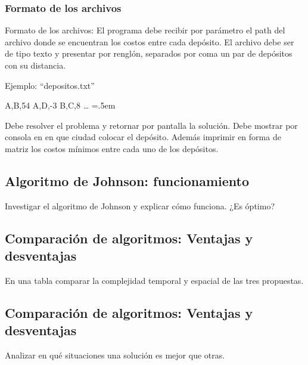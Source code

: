 \documentclass[titlepage,a4paper]{article}
\newenvironment{lcverbatim}
 {\SaveVerbatim{cverb}}
 {\endSaveVerbatim
  \flushleft\fboxrule=0pt\fboxsep=.5em
  \colorbox{cverbbg}{%
    \makebox[\dimexpr\linewidth-2\fboxsep][l]{\BUseVerbatim{cverb}}%
  }
  \endflushleft
}
\begin{document}
\subsubsection{Formato de los archivos}
Formato de los archivos:
El programa debe recibir por parámetro el path del archivo donde se encuentran los
costos entre cada depósito. El archivo debe ser de tipo texto y presentar por renglón,
separados por coma un par de depósitos con su distancia.

Ejemplo: “depositos.txt”

\begin{lcverbatim}
    A,B,54
    A,D,-3
    B,C,8
    …
\end{lcverbatim}

Debe resolver el problema y retornar por pantalla la solución. Debe mostrar por
consola en en que ciudad colocar el depósito. Además imprimir en forma de matriz los
costos mínimos entre cada uno de los depósitos.


\newpage\subsection{Algoritmo de Johnson: funcionamiento}\label{sec:parte1_1}
\begin{tcolorbox}[colback=blue!5!white,colframe=blue!75!black,title=Enunciado 1.1]
    Investigar el algoritmo de Johnson y explicar cómo funciona. ¿Es óptimo?
\end{tcolorbox}

\newpage\subsection{Comparación de algoritmos: Ventajas y desventajas}\label{sec:parte1_2}
\begin{tcolorbox}[colback=blue!5!white,colframe=blue!75!black,title=Enunciado 1.2]
    En una tabla comparar la complejidad temporal y espacial de las tres propuestas.
\end{tcolorbox}

\newpage\subsection{Comparación de algoritmos: Ventajas y desventajas}\label{sec:parte1_3}
\begin{tcolorbox}[colback=blue!5!white,colframe=blue!75!black,title=Enunciado 1.3]
    Analizar en qué situaciones una solución es mejor que otras.
\end{tcolorbox}
\end{document}
